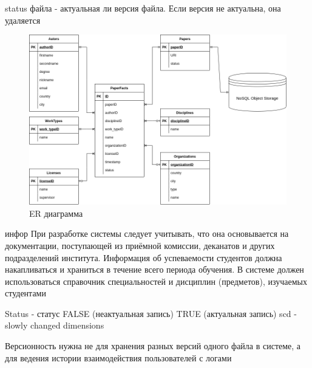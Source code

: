\documentclass[a4paper,14pt]{extarticle}
\begin{document}
status файла - актуальная ли версия файла. 
Если версия не актуальна, она удаляется



\begin{figure}[h!]
	\centering
	\includegraphics[width=0.8\linewidth]{images/data-model}
	\caption{ER диаграмма}
	\label{fig:data-model}
\end{figure}





инфор При разработке системы следует учитывать, что она
основывается на документации, поступающей из приёмной комиссии,
деканатов и других подразделений института. Информация об успеваемости
студентов должна накапливаться и храниться в течение всего периода
обучения. В системе должен использоваться справочник специальностей и
дисциплин (предметов), изучаемых студентами



Status - статус FALSE (неактуальная запись) TRUE (актуальная запись)
scd - slowly changed dimensions

Версионность нужна не для хранения разных версий одного файла в системе, а для
ведения истории взаимодействия пользователей с логами
\end{document}
